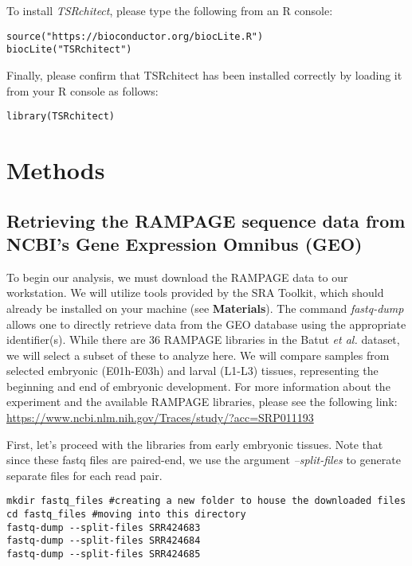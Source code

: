 \documentclass[runningheads,a4paper]{llncs}
\begin{document}
\begin{linenumbers}
\begin{itemize}
To install \textit{TSRchitect}, please type the following from an R console:

\indent
\begin{verbatim}
source("https://bioconductor.org/biocLite.R")
biocLite("TSRchitect")
\end{verbatim}

Finally, please confirm that TSRchitect has been installed correctly by loading it from your R console as follows:

\indent
\begin{verbatim}
library(TSRchitect)
\end{verbatim}

\section{Methods}

\subsection{Retrieving the RAMPAGE sequence data from NCBI's Gene Expression Omnibus (GEO)}

To begin our analysis, we must download the RAMPAGE data to our workstation. 
We will utilize tools provided by the SRA Toolkit, which should already be installed on your machine (see \textbf{Materials}).
The command \textit{fastq-dump} allows one to directly retrieve data from the GEO database using the appropriate identifier(s).
While there are 36 RAMPAGE libraries in the Batut \textit{et al.} dataset, we will select a subset of these to analyze here.
We will compare samples from selected embryonic (E01h-E03h) and larval (L1-L3) tissues, representing the beginning and end of embryonic development.
For more information about the experiment and the available RAMPAGE libraries, please see the following link: \url{https://www.ncbi.nlm.nih.gov/Traces/study/?acc=SRP011193}

First, let's proceed with the libraries from early embryonic tissues. 
Note that since these fastq files are paired-end, we use the argument \textit{--split-files} to generate separate files for each read pair.

\noindent
\begin{verbatim}
mkdir fastq_files #creating a new folder to house the downloaded files
cd fastq_files #moving into this directory
fastq-dump --split-files SRR424683
fastq-dump --split-files SRR424684
fastq-dump --split-files SRR424685
\end{verbatim}


\end{itemize}
\end{linenumbers}
\end{document}
